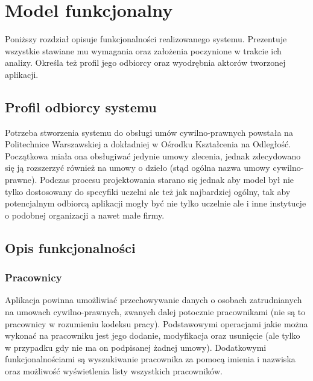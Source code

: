 \chapter{Model funkcjonalny}
\label{chap3}
Poniższy rozdział opisuje funkcjonalności realizowanego systemu. Prezentuje wszystkie stawiane mu wymagania oraz założenia poczynione w trakcie ich analizy. Określa też profil jego odbiorcy oraz wyodrębnia aktorów tworzonej aplikacji.


\section[Profil odbiorcy systemu][Profil odbiorcy systemu]{Profil odbiorcy systemu}
Potrzeba stworzenia systemu do obsługi umów cywilno-prawnych powstała na Politechnice Warszawskiej a dokładniej w Ośrodku Kształcenia na Odległość. Początkowa miała ona obsługiwać jedynie umowy zlecenia, jednak zdecydowano się ją rozszerzyć również na umowy o dzieło (stąd ogólna nazwa umowy cywilno-prawne). Podczas procesu projektowania starano się jednak aby model był nie tylko dostosowany do specyfiki uczelni ale też jak najbardziej ogólny, tak aby potencjalnym odbiorcą aplikacji mogły być nie tylko uczelnie ale i inne instytucje o podobnej organizacji a nawet małe firmy.

\section[Opis funkcjonalności][Opis funkcjonalności]{Opis funkcjonalności}

\subsection[Pracownicy][Pracownicy]{Pracownicy}
\label{pracownicy}
Aplikacja powinna umożliwiać przechowywanie danych o osobach zatrudnianych na umowach cywilno-prawnych, zwanych dalej potocznie pracownikami (nie są to pracownicy w rozumieniu kodeksu pracy). Podstawowymi operacjami jakie można wykonać na pracowniku jest jego dodanie, modyfikacja oraz usunięcie (ale tylko w przypadku gdy nie ma on podpisanej żadnej umowy). Dodatkowymi funkcjonalnościami są wyszukiwanie pracownika za pomocą imienia i nazwiska oraz możliwość wyświetlenia listy wszystkich pracowników.

